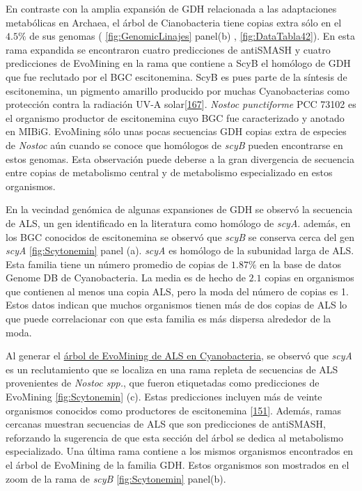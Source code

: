 \documentclass[12pt,twoside]{reedthesis}
\begin{document}
  En contraste con la amplia expansión de GDH relacionada a las
  adaptaciones metabólicas en Archaea, el árbol de Cianobacteria tiene
  copias extra sólo en el \(4.5\%\) de sus genomas (
  \autoref{fig:GenomicLinajes} panel(b) , \autoref{fig:DataTabla42}). En
  esta rama expandida se encontraron cuatro predicciones de antiSMASH y
  cuatro predicciones de EvoMining en la rama que contiene a ScyB el
  homólogo de GDH que fue reclutado por el BGC escitonemina. ScyB es pues
  parte de la síntesis de escitonemina, un pigmento amarillo producido por
  muchas Cyanobacterias como protección contra la radiación UV-A
  solar{[}\protect\hyperlink{ref-balskus_genetic_2010}{167}{]}.
  \emph{Nostoc punctiforme} PCC 73102 es el organismo productor de
  escitonemina cuyo BGC fue caracterizado y anotado en MIBiG. EvoMining
  sólo unas pocas secuencias GDH copias extra de especies de \emph{Nostoc}
  aún cuando se conoce que homólogos de \emph{scyB} pueden encontrarse en
  estos genomas. Esta observación puede deberse a la gran divergencia de
  secuencia entre copias de metabolismo central y de metabolismo
  especializado en estos organismos.
  
  En la vecindad genómica de algunas expansiones de GDH se observó la
  secuencia de ALS, un gen identificado en la literatura como homólogo de
  \emph{scyA}. además, en los BGC conocidos de escitonemina se observó que
  \emph{scyB} se conserva cerca del gen \emph{scyA}
  \autoref{fig:Scytonemin} panel (a). \emph{scyA} es homólogo de la
  subunidad larga de ALS. Esta familia tiene un número promedio de copias
  de \(1.87\%\) en la base de datos Genome DB de Cyanobacteria. La media
  es de hecho de \(2.1\) copias en organismos que contienen al menos una
  copia ALS, pero la moda del número de copias es 1. Estos datos indican
  que muchos organismos tienen más de dos copias de ALS lo que puede
  correlacionar con que esta familia es más dispersa alrededor de la moda.
  
  Al generar el
  \href{https://microreact.org/project/B11HkUtdm?tt=cr.}{árbol de
  EvoMining de ALS en Cyanobacteria}, se observó que \emph{scyA} es un
  reclutamiento que se localiza en una rama repleta de secuencias de ALS
  provenientes de \emph{Nostoc spp.}, que fueron etiquetadas como
  predicciones de EvoMining \autoref{fig:Scytonemin} (c). Estas
  predicciones incluyen más de veinte organismos conocidos como
  productores de escitonemina
  {[}\protect\hyperlink{ref-balskus_investigating_2008}{151}{]}. Además,
  ramas cercanas muestran secuencias de ALS que son predicciones de
  antiSMASH, reforzando la sugerencia de que esta sección del árbol se
  dedica al metabolismo especializado. Una última rama contiene a los
  mismos organismos encontrados en el árbol de EvoMining de la familia
  GDH. Estos organismos son mostrados en el zoom de la rama de \emph{scyB}
  \autoref{fig:Scytonemin} panel(b).
  
\end{document}
